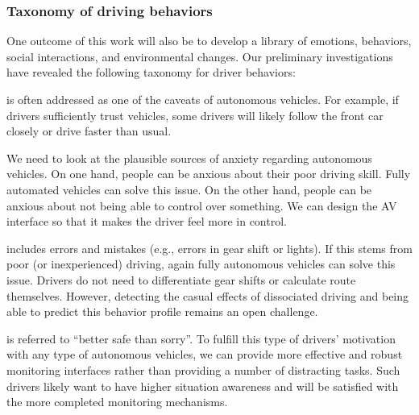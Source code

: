 \subsubsection{Taxonomy of driving behaviors}
One outcome of this work will also be to develop a library of emotions, behaviors, social interactions, and environmental changes. 
Our preliminary investigations have revealed the following taxonomy for driver behaviors:

 is often addressed as one of the caveats of autonomous vehicles. For example, if drivers sufficiently trust vehicles, some drivers will likely follow the front car closely or drive faster than usual. 

 We need to look at the plausible sources of anxiety regarding autonomous vehicles. On one hand, people can be anxious about their poor driving skill. Fully automated vehicles can solve this issue. On the other hand, people can be anxious about not being able to control over something. We can design the AV interface so that it makes the driver feel more in control.

 includes errors and mistakes (e.g., errors in gear shift or lights). If this stems from poor (or inexperienced) driving, again fully autonomous vehicles can solve this issue. Drivers do not need to differentiate gear shifts or calculate route themselves. However, detecting the casual effects of dissociated driving and being able to predict this behavior profile remains an open challenge.


 is referred to ``better safe than sorry''. 
To fulfill this type of drivers' motivation with any type of autonomous vehicles, we can provide more effective and robust monitoring interfaces rather than providing a number of distracting tasks. Such drivers likely want to have higher situation awareness and will be satisfied with the more completed monitoring mechanisms.

